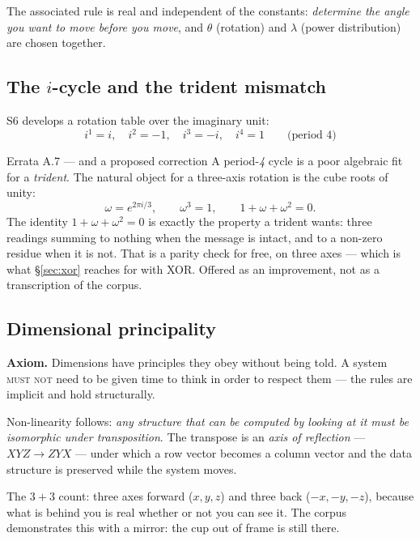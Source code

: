 \documentclass[11pt,a4paper]{article}
\newcommand{\MUSTNOT}{\textsc{must not}}
\begin{document}
The associated rule is real and independent of the constants: \emph{determine
the angle you want to move before you move}, and $\theta$ (rotation) and
$\lambda$ (power distribution) are chosen together.

\subsection{The $i$-cycle and the trident mismatch}
\label{sec:icycle}

S6 develops a rotation table over the imaginary unit:
\[
i^{1} = i, \quad i^{2} = -1, \quad i^{3} = -i, \quad i^{4} = 1
\qquad \text{(period 4)}
\]

\begin{errata}{Errata A.7 --- and a proposed correction}
A period-\emph{4} cycle is a poor algebraic fit for a \emph{trident}. The
natural object for a three-axis rotation is the cube roots of unity:
\[
\omega = e^{2\pi i/3}, \qquad \omega^{3} = 1, \qquad 1 + \omega + \omega^{2} = 0.
\]
The identity $1 + \omega + \omega^{2} = 0$ is exactly the property a trident
wants: three readings summing to nothing when the message is intact, and to a
non-zero residue when it is not. That is a parity check for free, on three axes
--- which is what \S\ref{sec:xor} reaches for with XOR. Offered as an
improvement, not as a transcription of the corpus.
\end{errata}

\subsection{Dimensional principality}

\begin{ruleblock}
\textbf{Axiom.} Dimensions have principles they obey without being told. A
system \MUSTNOT{} need to be given time to think in order to respect them ---
the rules are implicit and hold structurally.
\end{ruleblock}

Non-linearity follows: \emph{any structure that can be computed by looking at it
must be isomorphic under transposition}. The transpose is an \emph{axis of
reflection} --- $XYZ \rightarrow ZYX$ --- under which a row vector becomes a
column vector and the data structure is preserved while the system moves.

The $3+3$ count: three axes forward ($x,y,z$) and three back ($-x,-y,-z$),
because what is behind you is real whether or not you can see it. The corpus
demonstrates this with a mirror: the cup out of frame is still there.
\end{document}

